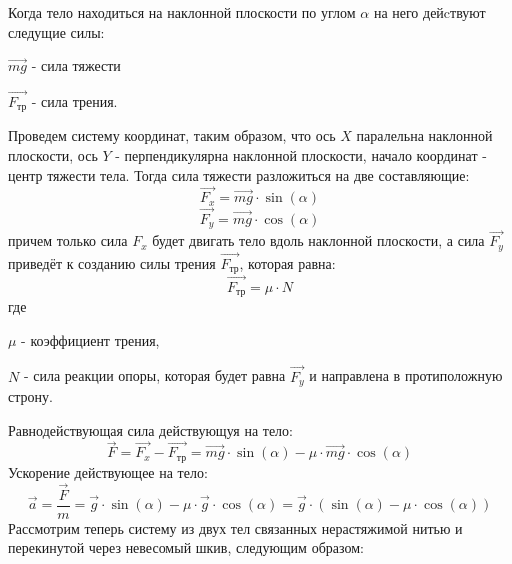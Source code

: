 \documentclass{minimal}
\begin{document}

    \noindent
    Когда тело находиться на наклонной плоскости по углом $\alpha$ на него дейcтвуют следущие силы: 

    $\vec{mg}$ - сила тяжести

    $\vec{F_{\text{тр}}}$ - сила трения. 

    \noindent
    Проведем систему координат, таким образом, что ось $X$ паралельна наклонной плоскости, ось $Y$ - перпендикулярна наклонной плоскости, начало координат - центр тяжести тела. Тогда сила тяжести разложиться на две составляющие:
    \[
        \vec{F_x} = \vec{mg} \cdot \sin(\alpha)
    \]
    \[
        \vec{F_y} = \vec{mg} \cdot \cos(\alpha)
    \]
    причем только сила  $F_x$ будет двигать тело вдоль наклонной плоскости, а сила $\vec{F_y}$ приведёт к созданию силы трения $\vec{F_{\text{тр}}}$, которая равна:
    \[
        \vec{F_{\text{тр}}} = \mu \cdot N
    \]
    где

    $\mu$ - коэффициент трения, 

    $N$ - сила реакции опоры, которая будет равна $\vec{F_y}$ и направлена в протиположную строну.

    Равнодействующая сила действующуя на тело:
    \[
        \vec{F} = \vec{F_x} - \vec{F_{\text{тр}}} = \vec{mg} \cdot \sin(\alpha) - \mu \cdot \vec{mg} \cdot \cos(\alpha)
    \]
    Ускорение действующее на тело:
    \[
        \vec{a} = \frac{\vec{F}}{m} = \vec{g} \cdot \sin(\alpha) - \mu \cdot \vec{g} \cdot \cos(\alpha) = \vec{g} \cdot (\sin(\alpha) - \mu \cdot \cos(\alpha))
    \]
    Рассмотрим теперь систему из двух тел связанных нерастяжимой нитью и перекинутой через невесомый шкив, следующим образом:
\end{document}
